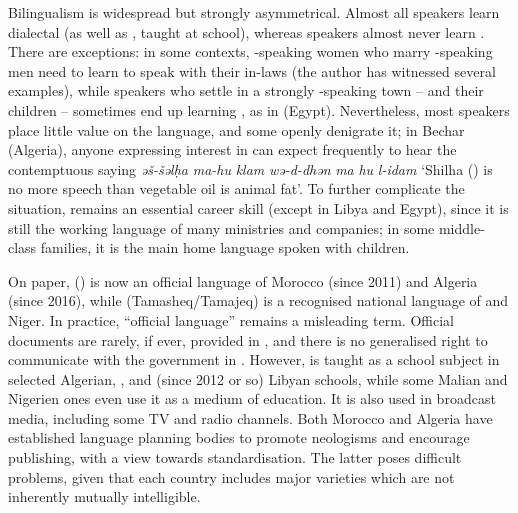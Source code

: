 \documentclass[output=paper]{langsci/langscibook}
\begin{document}
Bilingualism is widespread but strongly asymmetrical. Almost all  speakers learn dialectal  (as well as  , taught at school), whereas  speakers almost never learn .  There are exceptions: in some contexts, -speaking women who marry -speaking men need to learn  to speak with their in-laws (the author has witnessed several  examples), while  speakers who settle in a strongly -speaking town – and their children – sometimes end up learning , as in  (Egypt). Nevertheless, most  speakers place little value on the language, and some openly denigrate it; in Bechar (Algeria), anyone expressing interest in  can expect frequently to hear the contemptuous saying \textit{əš-šəlḥa} \textit{ma-hu} \textit{klam} \textit{wə-d-dhən} \textit{ma} \textit{hu} \textit{l-idam} `Shilha () is no more speech than vegetable oil is animal fat'. To further complicate the situation,  remains an essential career skill (except in Libya and Egypt), since it is still the working language of many ministries and companies; in some middle-class families, it is the main home language spoken with children.

On paper,  () is now an official language of Morocco (since 2011) and Algeria (since 2016), while  (Tamasheq/Tamajeq) is a recognised national language of  and Niger. In practice, “official language” remains a misleading term.  Official documents are rarely, if ever, provided in , and there is no generalised right to communicate with the government in .  However,  is taught as a school subject in selected Algerian, , and (since 2012 or so) Libyan schools, while some Malian and Nigerien ones even use it as a medium of education. It is also used in broadcast media, including some TV and radio channels. Both Morocco and Algeria have established language planning bodies to promote neologisms and encourage publishing, with a view towards standardisation. The latter poses difficult problems, given that each country includes major varieties which are not inherently mutually intelligible.
\end{document}
